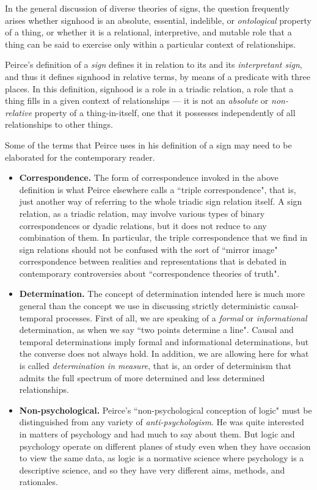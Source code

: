 \documentclass[12pt]{article}
\begin{document}
In the general discussion of diverse theories of signs, the question frequently arises whether signhood is an absolute, essential, indelible, or \textit{ontological} property of a thing, or whether it is a relational, interpretive, and mutable role that a thing can be said to exercise only within a particular context of relationships.

Peirce's definition of a \textit{sign} defines it in relation to its  and its \textit{interpretant sign}, and thus it defines signhood in relative terms, by means of a predicate with three places.  In this definition, signhood is a role in a triadic relation, a role that a thing fills in a given context of relationships --- it is not an \textit{absolute} or \textit{non-relative} property of a thing-in-itself, one that it possesses independently of all relationships to other things.

Some of the terms that Peirce uses in his definition of a sign may need to be elaborated for the contemporary reader.

\begin{itemize}
\item
\textbf{Correspondence.}  The form of correspondence invoked in the above definition is what Peirce elsewhere calls a ``triple correspondence", that is, just another way of referring to the whole triadic sign relation itself.  A sign relation, as a triadic relation, may involve various types of binary correspondences or dyadic relations, but it does not reduce to any combination of them.  In particular, the triple correspondence that we find in sign relations should not be confused with the sort of ``mirror image" correspondence between realities and representations that is debated in contemporary controversies about ``correspondence theories of truth".
\item
\textbf{Determination.}  The concept of determination intended here is much more general than the concept we use in discussing strictly deterministic causal-temporal processes.  First of all, we are speaking of a \textit{formal} or \textit{informational} determination, as when we say ``two points determine a line".  Causal and temporal determinations imply formal and informational determinations, but the converse does not always hold.  In addition, we are allowing here for what is called \textit{determination in measure}, that is, an order of determinism that admits the full spectrum of more determined and less determined relationships.
\item
\textbf{Non-psychological.}  Peirce's ``non-psychological conception of logic" must be distinguished from any variety of \textit{anti-psychologism}.  He was quite interested in matters of psychology and had much to say about them.  But logic and psychology operate on different planes of study even when they have occasion to view the same data, as logic is a normative science where psychology is a descriptive science, and so they have very different aims, methods, and rationales.
\end{itemize}
\end{document}
